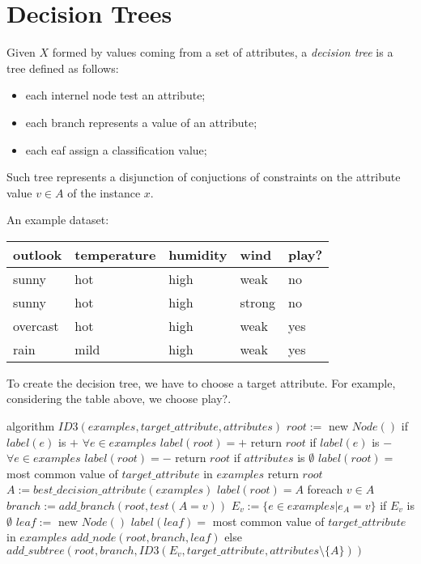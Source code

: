 \section{Decision Trees}

Given $X$ formed by values coming from a set of attributes, a {\em decision tree} is a tree defined as follows:

\begin{itemize}
    \item each internel node test an attribute;
    \item each branch represents a value of an attribute;
    \item each eaf assign a classification value;
\end{itemize}

Such tree represents a disjunction of conjuctions of constraints on the attribute value $v \in A$ of the instance $x$.

An example dataset:

\bigskip
\begin{tabular}{|l|l|l|l|l|} \hline
\textbf{outlook} & \textbf{temperature} & \textbf{humidity} & \textbf{wind} & \textbf{play?} \\ \hline
sunny & hot & high & weak & no \\ \hline
sunny & hot & high & strong & no \\ \hline
overcast & hot & high & weak & yes \\ \hline
rain & mild & high & weak & yes \\ \hline
\end{tabular}
\bigskip

To create the decision tree, we have to choose a target attribute. For example, considering the table above, we choose play?.

\begin{pseudo}
algorithm $ID3(examples, target\_attribute, attributes)$
    $root := $ new $Node()$
    if $label(e)$ is $+$ $\forall e \in examples$
        $label(root) = +$
        return $root$
    if $label(e)$ is $-$ $\forall e \in examples$
        $label(root) = -$
        return $root$
    if $attributes$ is $\emptyset$
        $label(root) = $ most common value of $target\_attribute$ in $examples$
        return $root$
    $A := best\_decision\_attribute(examples)$
    $label(root) = A$
    foreach $v \in A$
        $branch := add\_branch(root, test(A = v))$
        $E_v := \{e \in examples | e_A = v\}$
        if $E_v$ is $\emptyset$
            $leaf := $ new $Node()$
            $label(leaf) = $ most common value of $target\_attribute$ in $examples$
            $add\_node(root, branch, leaf)$
        else
            $add\_subtree(root, branch, ID3(E_v, target\_attribute, attributes \setminus \{A\}))$
\end{pseudo}

